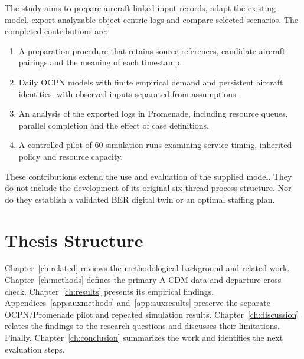 The study aims to prepare aircraft-linked input records, adapt the existing model, export analyzable object-centric logs and compare selected scenarios. The completed contributions are:
\begin{enumerate}
\item A preparation procedure that retains source references, candidate aircraft pairings and the meaning of each timestamp.
\item Daily OCPN models with finite empirical demand and persistent aircraft identities, with observed inputs separated from assumptions.
\item An analysis of the exported logs in Promenade, including resource queues, parallel completion and the effect of case definitions.
\item A controlled pilot of 60 simulation runs examining service timing, inherited policy and resource capacity.
\end{enumerate}

These contributions extend the use and evaluation of the supplied model. They do not include the development of its original six-thread process structure. Nor do they establish a validated BER digital twin or an optimal staffing plan.

\section{Thesis Structure}
Chapter~\ref{ch:related} reviews the methodological background and related work. Chapter~\ref{ch:methods} defines the primary A-CDM data and departure cross-check. Chapter~\ref{ch:results} presents its empirical findings. Appendices~\ref{app:auxmethods} and~\ref{app:auxresults} preserve the separate OCPN/Promenade pilot and repeated simulation results. Chapter~\ref{ch:discussion} relates the findings to the research questions and discusses their limitations. Finally, Chapter~\ref{ch:conclusion} summarizes the work and identifies the next evaluation steps.
